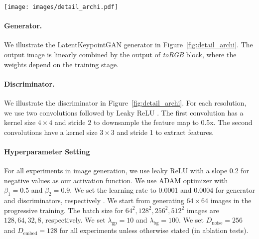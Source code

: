 \documentclass[10pt, conference, compsocconf]{IEEEtran}
\begin{document}
\begin{figure*}[t]
\begin{center}
   \texttt{[image: images/detail\_archi.pdf]}
\end{center}
   \caption{\textbf{Detailed architecture.} (Left) \textbf{LatentKeypointGAN generator.} The numbers in the parenthesis is the output dimension of the Keypoint-based ConvBlock. For example, (512, 4, 4) means the output feature map has a resolution of $4\times 4$ and the channel size is 512. The toRGB blocks are $1\times1$ convolutions to generate the RGB images with the same resolution as corresponding feature maps. (Middle) \textbf{LatentKeypointGAN discriminator.} The number in the last parenthesis is the output dimension. For example, (512, 4, 4) means the output feature map has a resolution of $4\times 4$ and the channel size is 512. At each resolution, we apply two convolutions, one with stride 2 to downsample feature maps and one with stride 1 to extract features. Leaky ReLU \cite{maas2013rectifier} is used after all convolutions except the linear layer in the last.. (Right) \textbf{Progressive Training.}. The adapting period is the same as PGGAN \cite{karras2018progressive} and StyleGAN \cite{karras2019style}. In the non-adapting period, we do not use the linear combination.}
\label{fig:detail_archi}
\end{figure*}

\paragraph{Generator.} We illustrate the LatentKeypointGAN generator in Figure~\ref{fig:detail_archi}. The output image is linearly combined by the output of \textit{toRGB} block, where the weights depend on the training stage.

\paragraph{Discriminator.}
We illustrate the discriminator in Figure~\ref{fig:detail_archi}. For each resolution, we use two convolutions followed by Leaky ReLU \cite{maas2013rectifier}. The first convolution has a kernel size $4\times 4$ and stride 2 to downsample the feature map to 0.5x. The second convolutions have a kernel size $3\times 3$ and stride 1 to extract features.

\paragraph{Hyperparameter Setting}
For all experiments in image generation, we use leaky ReLU \cite{maas2013rectifier} with a slope 0.2 for negative values as our activation function. We use ADAM optimizer \cite{KingmaB14} with $\beta_1=0.5$ and $\beta_2=0.9$. We set the learning rate to 0.0001 and 0.0004 for generator and discriminators, respectively \cite{heusel2017gans}. We start from generating $64\times 64$ images in the progressive training. The batch size for $64^2, 128^2, 256^2, 512^2$ images are $128,64,32,8$, respectively. We set $\lambda_\text{gp}=10$ and $\lambda_\text{bg}=100$. We set $D_\text{noise}=256$ and $D_\text{embed}=128$ for all experiments unless otherwise stated (in ablation tests).
\end{document}
